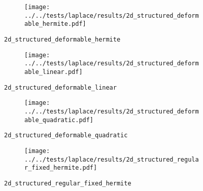 %
%
\begin{frame}{}
  \vspace*{-0.2cm}
  \begin{figure}[h!]
    \begin{subfigure}[t]{0.48\textwidth}%
      \centering%
      \texttt{[image: ../../tests/laplace/results/2d\_structured\_deformable\_hermite.pdf]}%
    \end{subfigure}%
    \caption{\lstinline{2d_structured_deformable_hermite}}
  \end{figure} 
\end{frame}
%
%
\begin{frame}{}
  \vspace*{-0.2cm}
  \begin{figure}[h!]
    \begin{subfigure}[t]{0.48\textwidth}%
      \centering%
      \texttt{[image: ../../tests/laplace/results/2d\_structured\_deformable\_linear.pdf]}%
    \end{subfigure}%
    \caption{\lstinline{2d_structured_deformable_linear}}
  \end{figure} 
\end{frame}
%
%
\begin{frame}{}
  \vspace*{-0.2cm}
  \begin{figure}[h!]
    \begin{subfigure}[t]{0.48\textwidth}%
      \centering%
      \texttt{[image: ../../tests/laplace/results/2d\_structured\_deformable\_quadratic.pdf]}%
    \end{subfigure}%
    \caption{\lstinline{2d_structured_deformable_quadratic}}
  \end{figure} 
\end{frame}
%
%
\begin{frame}{}
  \vspace*{-0.2cm}
  \begin{figure}[h!]
    \begin{subfigure}[t]{0.48\textwidth}%
      \centering%
      \texttt{[image: ../../tests/laplace/results/2d\_structured\_regular\_fixed\_hermite.pdf]}%
    \end{subfigure}%
    \caption{\lstinline{2d_structured_regular_fixed_hermite}}
  \end{figure}
\end{frame}

